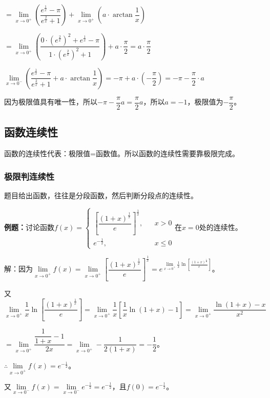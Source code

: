 $=\lim\limits_{x\to 0^+}\left(\dfrac{e^{\frac{1}{x}}-\pi}{e^{\frac{2}{x}}+1}\right)+\lim\limits_{x\to 0^+}\left(a\cdot\arctan\dfrac{1}{x}\right)$

$=\lim\limits_{x\to 0^+}\left(\dfrac{0\cdot\left(e^{\frac{2}{x}}\right)^2+e^{\frac{1}{x}}-\pi}{1\cdot\left(e^{\frac{2}{x}}\right)^2+1}\right)+a\cdot\dfrac{\pi}{2}=a\cdot\dfrac{\pi}{2}$

\medskip

$\lim\limits_{x\to 0^-}\left(\dfrac{e^{\frac{1}{x}}-\pi}{e^{\frac{2}{x}}+1}+a\cdot\arctan\dfrac{1}{x}\right)=-\pi+a\cdot\left(-\dfrac{\pi}{2}\right)=-\pi-\dfrac{\pi}{2}\cdot a$

因为极限值具有唯一性，所以$-\pi-\dfrac{\pi}{2}a=\dfrac{\pi}{2}a$，所以$a=-1$，极限值为$-\dfrac{\pi}{2}$。

\subsection{函数连续性}

函数的连续性代表：极限值=函数值。所以函数的连续性需要靠极限完成。

\subsubsection{极限判连续性}

题目给出函数，往往是分段函数，然后判断分段点的连续性。\medskip

\textbf{例题：}讨论函数$f(x)=\left\{\begin{array}{lcl}
    \left[\dfrac{(1+x)^{\frac{1}{x}}}{e}\right]^{\frac{1}{x}},& & x>0 \\
    e^{-\frac{1}{2}}, & & x\leqslant 0
\end{array}\right.$在$x=0$处的连续性。

解：因为$\lim\limits_{x\to 0^+}f(x)=\lim\limits_{x\to 0^+}\left[\dfrac{(1+x)^{\frac{1}{x}}}{e}\right]^{\frac{1}{x}}=e^{\lim\limits_{x\to 0^+}\frac{1}{x}\ln[\frac{(1+x)^{\frac{1}{x}}}{e}]}$。

又$\lim\limits_{x\to 0^+}\dfrac{1}{x}\ln\left[\dfrac{(1+x)^{\frac{1}{x}}}{e}\right]=\lim\limits_{x\to 0^+}\dfrac{1}{x}\left[\dfrac{1}{x}\ln(1+x)-1\right]=\lim\limits_{x\to 0^+}\dfrac{\ln(1+x)-x}{x^2}$

$=\lim\limits_{x\to 0^+}\dfrac{\dfrac{1}{1+x}-1}{2x}=\lim\limits_{x\to 0^+}-\dfrac{1}{2(1+x)}=-\dfrac{1}{2}$。

$\therefore\lim\limits_{x\to 0^+}f(x)=e^{-\frac{1}{2}}$。

又$\lim\limits_{x\to 0^-}f(x)=\lim\limits_{x\to 0^-}e^{-\frac{1}{2}}=e^{-\frac{1}{2}}$，且$f(0)=e^{-\frac{1}{2}}$。

